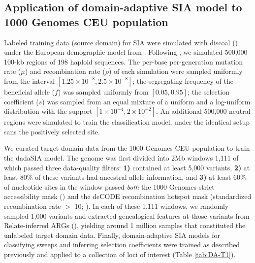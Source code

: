 \subsection{Application of domain-adaptive \ac{SIA} model to 1000 Genomes CEU population}

Labeled training data (source domain) for \ac{SIA} were simulated with discoal (\cite{kern_discoal_2016}) under the European demographic model from \cite{tennessen_evolution_2012}. Following \cite{hejase_deep-learning_2022}, we simulated 500,000 100-kb regions of 198 haploid sequences. The per-base per-generation mutation rate ($\mu$) and recombination rate ($\rho$) of each simulation were sampled uniformly from the interval $[1.25\times 10^{-8}, 2.5\times 10^{-8}]$; the segregating frequency of the beneficial allele ($f$) was sampled uniformly from $[0.05, 0.95]$; the selection coefficient ($s$) was sampled from an equal mixture of a uniform and a log-uniform distribution with the support $[1\times 10^{-4}, 2\times 10^{-2}]$. An additional 500,000 neutral regions were simulated to train the classification model, under the identical setup sans the positively selected site.

We curated target domain data from the 1000 Genomes CEU population to train the \ac{dadaSIA} model. The genome was first divided into 2Mb windows 1,111 of which passed three data-quality filters: \textbf{1)} contained at least 5,000 variants, \textbf{2)} at least 80\% of these variants had ancestral allele information, and \textbf{3)} at least 60\% of nucleotide sites in the window passed \textit{both} the 1000 Genomes strict accessibility mask (\cite{auton_global_2015}) and the deCODE recombination hotspot mask (standardized recombination rate $>$ 10; \cite{kong_fine-scale_2010}). In each of these 1,111 windows, we randomly sampled 1,000 variants and extracted genealogical features at those variants from Relate-inferred \acp{ARG} (\cite{speidel_method_2019}), yielding around 1 million samples that constituted the unlabeled target domain data. Finally, domain-adaptive \ac{SIA} models for classifying sweeps and inferring selection coefficients were trained as described previously and applied to a collection of loci of interest (Table \ref{tab:DA-T1}).

